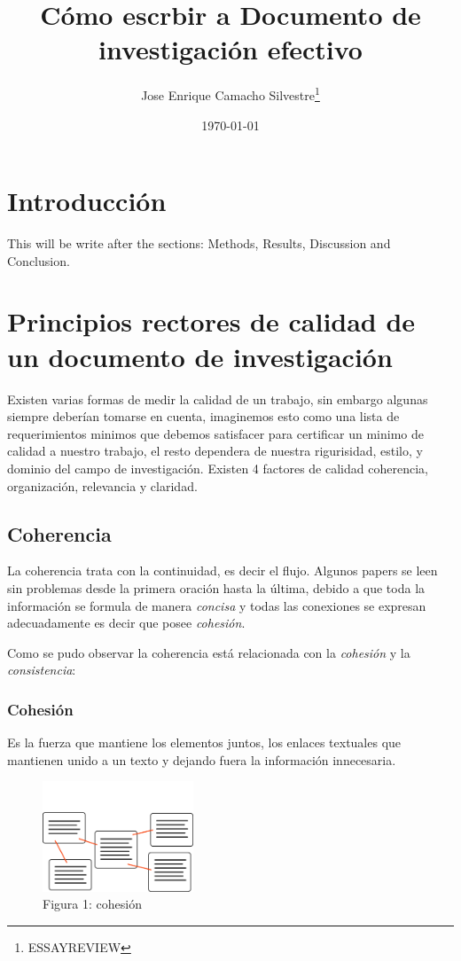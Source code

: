\documentclass[a4paper, 12pt]{article}
\title{C\'omo escrbir a Documento de investigaci\'on efectivo}
\author{Jose Enrique Camacho Silvestre\thanks{ESSAYREVIEW}}
\date{\today}
\begin{document}
	\maketitle
	
	\section{Introducci\'on}
	This will be write after the sections: Methods, Results, Discussion and Conclusion.
	
	\section{Principios rectores de calidad de un documento de investigaci\'on}
		Existen varias formas de medir la calidad de un trabajo, sin embargo algunas siempre deber\'ian tomarse en cuenta, imaginemos esto como una lista de requerimientos minimos que debemos satisfacer para certificar un minimo de calidad a nuestro trabajo, el resto dependera de nuestra rigurisidad, estilo, y dominio del campo de investigaci\'on. Existen 4 factores de calidad coherencia, organizaci\'on, relevancia y claridad.
		
		\subsection{Coherencia}
			La coherencia trata con la continuidad, es decir el flujo. Algunos papers se leen sin problemas desde la primera oraci\'on hasta la \'ultima, debido a que toda la informaci\'on se formula de manera \emph{concisa} y todas las conexiones se expresan adecuadamente es decir que posee \emph{cohesi\'on}.
			 
			 Como se pudo observar la coherencia est\'a relacionada con la \emph{cohesi\'on} y la \emph{consistencia}:
			\subsubsection{Cohesi\'on}
				Es la fuerza que mantiene los elementos juntos, los enlaces textuales que mantienen unido a un texto y dejando fuera la informaci\'on innecesaria.
					\begin{figure}[h]
						\centering
						\includegraphics[width=0.4\textwidth]{cohesion.pdf}
						\caption{Figura 1: cohesi\'on}
						\label{fig: fig1}
					\end{figure}
\end{document}
